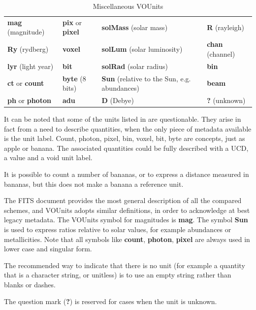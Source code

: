\documentclass[11pt,notitlepage,onecolumn]{ivoa}
\newcommand{\unit}[1]{\textbf{\textsf{\color{orange}#1}}}
\begin{document}
\begin{table}[ht]
\begin{center}
\begin{tabular}{|l|l|p{3cm}|l|}\hline
\unit{mag} (magnitude)		&\unit{pix}  or \unit{pixel} 	&\unit{solMass} (solar mass)     &\unit{R} (rayleigh) \\
\unit{Ry} (rydberg)		&\unit{voxel}    		&\unit{solLum} (solar luminosity)&\unit{chan} (channel) 	\\
\unit{lyr} (light year)		&\unit{bit}   			&\unit{solRad} (solar radius)	&\unit{bin} \\
\unit{ct} or \unit{count}	&\unit{byte} (8 bits)   	&\unit{Sun} (relative to the Sun, e.g. abundances)&\unit{beam} 	\\
\unit{ph} or \unit{photon} 	&\unit{adu}     		&\unit{D} (Debye)	&\unit{?} (unknown)\\\hline
\end{tabular}
\end{center}
\caption{\label{tab:voumisc}Miscellaneous VOUnits}
\end{table}

It can be noted that some of the units listed in  are 
questionable. They arise in fact from a need to describe quantities, when the only
piece of metadata available is the unit label. Count, photon, pixel, bin, voxel, bit,
byte are concepts, just as apple or banana. The associated quantities could be fully
described with a UCD, a value and a void unit label.

It is possible to count a number of bananas, or to express a distance measured in
bananas, but this does not make a banana a reference unit.

The FITS document provides the most general description of all the compared schemes, 
and VOUnits adopts similar definitions, in order to acknowledge at best legacy metadata.
The VOUnits symbol for magnitudes is \unit{mag}.
The symbol \unit{Sun} is used to express ratios relative to solar values, for example
abundances or metallicities.
Note that all symbols like \unit{count}, \unit{photon}, \unit{pixel} are always used
in lower case and singular form.

The recommended way to indicate that there is no unit (for example a quantity that
is a character string, or unitless) is to use an empty string rather than blanks
or dashes.

The question mark (\unit{?}) is reserved for cases when the unit is unknown.
\end{document}
